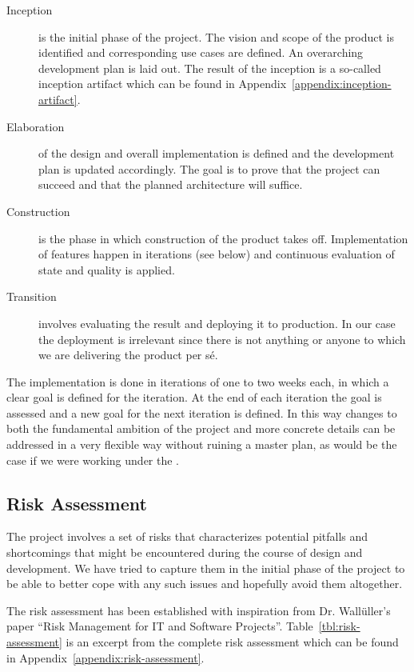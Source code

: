\begin{description}
\item[Inception] is the initial phase of the project. The vision and scope of
  the product is identified and corresponding use cases are defined. An
  overarching development plan is laid out. The result of the inception is a
  so-called inception artifact which can be found in
  Appendix~\ref{appendix:inception-artifact}.

\item[Elaboration] of the design and overall implementation is defined and the
  development plan is updated accordingly. The goal is to prove that the project
  can succeed and that the planned architecture will suffice.

\item[Construction] is the phase in which construction of the product takes
  off. Implementation of features happen in iterations (see below) and
  continuous evaluation of state and quality is applied.

\item[Transition] involves evaluating the result and deploying it to
  production. In our case the deployment is irrelevant since there is not
  anything or anyone to which we are delivering the product per s\'e.

\end{description}

The implementation is done in iterations of one to two weeks each, in which a
clear goal is defined for the iteration. At the end of each iteration the goal
is assessed and a new goal for the next iteration is defined. In this way
changes to both the fundamental ambition of the project and more concrete
details can be addressed in a very flexible way without ruining a master plan,
as would be the case if we were working under the .

\subsection{Risk Assessment}
\label{sec:project-mgmt:risk-assessment}

The project involves a set of risks that characterizes potential pitfalls and
shortcomings that might be encountered during the course of design and
development. We have tried to capture them in the initial phase of the project
to be able to better cope with any such issues and hopefully avoid them
altogether.

The risk assessment has been established with inspiration from Dr. Wall\"uller's
paper ``Risk Management for IT and Software
Projects''\cite{risk-assessment}. Table~\ref{tbl:risk-assessment} is an excerpt
from the complete risk assessment which can be found in
Appendix~\ref{appendix:risk-assessment}.

